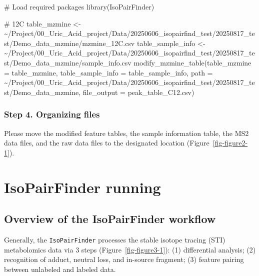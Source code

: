 \documentclass[
  letterpaper,
  DIV=11,
  numbers=noendperiod]{scrreprt}
\newenvironment{Shaded}{\begin{snugshade}}{\end{snugshade}}
\newcommand{\AttributeTok}[1]{\textcolor[rgb]{0.40,0.45,0.13}{#1}}
\newcommand{\CommentTok}[1]{\textcolor[rgb]{0.37,0.37,0.37}{#1}}
\newcommand{\FunctionTok}[1]{\textcolor[rgb]{0.28,0.35,0.67}{#1}}
\newcommand{\NormalTok}[1]{\textcolor[rgb]{0.00,0.23,0.31}{#1}}
\newcommand{\OtherTok}[1]{\textcolor[rgb]{0.00,0.23,0.31}{#1}}
\newcommand{\StringTok}[1]{\textcolor[rgb]{0.13,0.47,0.30}{#1}}
\begin{document}
\begin{Shaded}
\begin{Highlighting}[]
\CommentTok{\# Load required packages}
\FunctionTok{library}\NormalTok{(IsoPairFinder)}

\CommentTok{\# 12C}
\NormalTok{table\_mzmine }\OtherTok{\textless{}{-}} \StringTok{\textquotesingle{}\textasciitilde{}/Project/00\_Uric\_Acid\_project/Data/20250606\_isopairfind\_test/20250817\_test/Demo\_data\_mzmine/mzmine\_12C.csv\textquotesingle{}}
\NormalTok{table\_sample\_info }\OtherTok{\textless{}{-}} \StringTok{\textquotesingle{}\textasciitilde{}/Project/00\_Uric\_Acid\_project/Data/20250606\_isopairfind\_test/20250817\_test/Demo\_data\_mzmine/sample\_info.csv\textquotesingle{}}
\FunctionTok{modify\_mzmine\_table}\NormalTok{(}\AttributeTok{table\_mzmine =}\NormalTok{ table\_mzmine,}
                    \AttributeTok{table\_sample\_info =}\NormalTok{ table\_sample\_info,}
                    \AttributeTok{path =} \StringTok{\textquotesingle{}\textasciitilde{}/Project/00\_Uric\_Acid\_project/Data/20250606\_isopairfind\_test/20250817\_test/Demo\_data\_mzmine\textquotesingle{}}\NormalTok{,}
                    \AttributeTok{file\_output =} \StringTok{\textquotesingle{}peak\_table\_C12.csv\textquotesingle{}}\NormalTok{)}
\end{Highlighting}
\end{Shaded}

\subsection{Step 4. Organizing files}\label{step-4.-organizing-files-2}

Please move the modified feature tables, the sample information table,
the MS2 data files, and the raw data files to the designated location
(Figure~\ref{fig-figure2-1}).


\chapter{IsoPairFinder running}\label{sec-isoPairFinder-running}

\section{Overview of the IsoPairFinder
workflow}\label{overview-of-the-isopairfinder-workflow}

Generally, the \texttt{IsoPairFinder} processes the stable isotope
tracing (STI) metabolomics data via 3 steps
(Figure~\ref{fig-figure3-1}): (1) differential analysis; (2) recognition
of adduct, neutral loss, and in-source fragment; (3) feature pairing
between unlabeled and labeled data.
\end{document}
